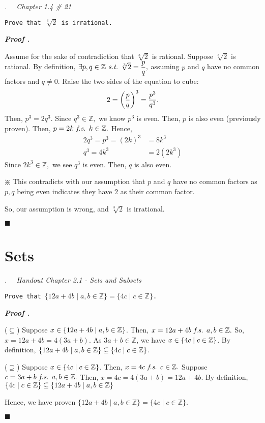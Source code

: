 \documentclass[11pt,letter]{article}
\newcounter{nq}[section]
\newcounter{np}[section]
\newenvironment*{p}{\par\noindent\textbf{\textit{Proof \stepcounter{np}\thenp. }}\par}{\par\hfill $\blacksquare$\par}
\newenvironment*{q}[1]{\noindent\emph{\thesection.\stepcounter{nq}\thenq$\quad $ #1}\par\noindent\texttt}{}
\def\Z{{\mathbb{Z}}}
\def\st{\emph{ s.t. }}
\def\fs{\emph{ f.s. }}
\begin{document}
\begin{framed}\begin{q}
	{Chapter 1.4 \# 21}
	{Prove that $\sqrt[3]{2}$ is irrational.}
\end{q}\end{framed}
\begin{p}
	Assume for the sake of contradiction that $\sqrt[3]{2}$	is rational. Suppose $\sqrt[3]{2}$ is rational. By definition, $\exists p,q\in\Z\st\sqrt[3]{2}=\dfrac{p}{q},$ assuming $p$ and $q$ have no common factors and $q\neq0.$ Raise the two sides of the equation to cube: \[2=\qty(\dfrac{p}{q})^3=\dfrac{p^3}{q^3}.\] Then, $p^3=2q^3.$ Since $q^3\in\Z,$ we know $p^3$ is even. Then, $p$ is also even (previously proven). Then, $p=2k\fs k\in\Z.$ Hence,\[\begin{aligned}2q^3=p^3=(2k)^3&=8k^3\\q^3=4k^3&=2(2k^3)\end{aligned}\] Since $2k^3\in\Z,$ we see $q^3$ is even. Then, $q$ is also even. \begin{center}$\divideontimes$ This contradicts with our assumption that $p$ and $q$ have no common factors as $p,q$ being even indicates they have $2$ as their common factor.\end{center} So, our assumption is wrong, and $\sqrt[3]{2}$ is irrational.
\end{p}

\newpage
\section{Sets}
\begin{framed}\begin{q}
	{Handout Chapter 2.1 - Sets and Subsets}
	{Prove that $\{12a+4b\mid a,b\in\Z\}=\{4c\mid c\in\Z\}$.}
\end{q}\end{framed}
\begin{p}
	($\subseteq$) Suppose $x\in\qty{12a+4b\mid a,b\in\Z}$. Then, $x=12a+4b\fs a,b\in\Z.$ So, $x=12a+4b=4(3a+b).$ As $3a+b\in\Z$, we have $x\in\qty{4c\mid c\in\Z}$. By definition, $\qty{12a+4b\mid a,b\in\Z}\subseteq\qty{4c\mid c\in\Z}$.\par
	($\supseteq$) Suppose $x\in\qty{4c\mid c\in\Z}$. Then, $x=4c\fs c\in\Z.$ Suppose $c=3a+b\fs a,b\in\Z.$ Then, $x=4c=4(3a+b)=12a+4b.$ By definition, $\qty{4c\mid c\in\Z}\subseteq\qty{12a+4b\mid a,b\in\Z}$\par
	Hence, we have proven $\{12a+4b\mid a,b\in\Z\}=\{4c\mid c\in\Z\}.$
\end{p}
\end{document}
